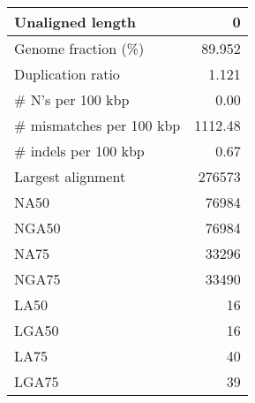 \documentclass[12pt,a4paper]{article}
\begin{document}
\begin{table}[ht]
\begin{center}
\begin{tabular}{|l*{1}{|r}|}
Unaligned length & 0 \\ \hline
Genome fraction (\%) & 89.952 \\ \hline
Duplication ratio & 1.121 \\ \hline
\# N's per 100 kbp & 0.00 \\ \hline
\# mismatches per 100 kbp & 1112.48 \\ \hline
\# indels per 100 kbp & 0.67 \\ \hline
Largest alignment & 276573 \\ \hline
NA50 & 76984 \\ \hline
NGA50 & 76984 \\ \hline
NA75 & 33296 \\ \hline
NGA75 & 33490 \\ \hline
LA50 & 16 \\ \hline
LGA50 & 16 \\ \hline
LA75 & 40 \\ \hline
LGA75 & 39 \\ \hline
\end{tabular}
\end{center}
\end{table}
\end{document}
